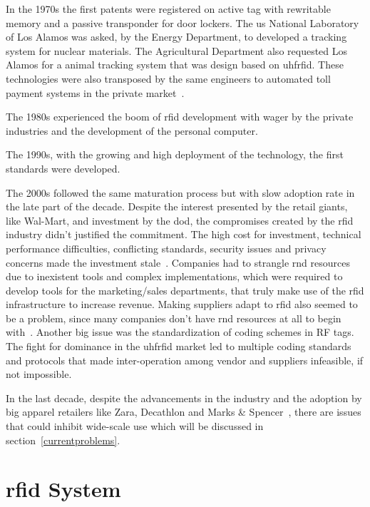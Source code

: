In the 1970s the first patents were registered on active tag with rewritable memory and a passive transponder for door lockers. The \ac{us} National Laboratory of Los Alamos was asked, by the Energy Department, to developed a tracking system for nuclear materials. The Agricultural Department also requested Los Alamos for a animal tracking system that was design based on \ac{uhfrfid}. These technologies were also transposed by the same engineers to automated toll payment systems in the private market~\cite{landtHistoryRFID2005, HistoryRFIDTechnology,casierAnalogCircuitDesign2011}.

The 1980s experienced the boom of \ac{rfid} development with wager by the private industries and the development of the personal computer.

The 1990s, with the growing and high deployment of the technology, the first standards were developed. 

The 2000s followed the same maturation process but with slow adoption rate in the late part of the decade. 
Despite the interest presented by the retail giants, like Wal-Mart, and investment by the \ac{dod}, the compromises created by the \ac{rfid} industry didn't justified the commitment. The high cost for investment, technical performance difficulties, conflicting standards, security issues and privacy concerns made the investment stale~\cite{RFIDAdoptionStalls}. 
Companies had to strangle \ac{rnd} resources due to inexistent tools and complex implementations, which were required to develop tools for the marketing/sales departments, that truly make use of the \ac{rfid} infrastructure to increase revenue.
Making suppliers adapt to \ac{rfid} also seemed to be a problem, since many companies don't have \ac{rnd} resources at all to begin with~\cite{gaudinSuppliersGainFailed2008}.
Another big issue was the standardization of coding schemes in RF tags. The fight for dominance in the \ac{uhfrfid} market led to multiple coding standards and protocols that made inter-operation among vendor and suppliers infeasible, if not impossible.

In the last decade, despite the advancements in the industry and the adoption by big apparel retailers like Zara, Decathlon and Marks \& Spencer~\cite{RFIDRetailApparel}, there are issues that could inhibit wide-scale use which will be discussed in section~\ref{currentproblems}.

\section{\ac{rfid} System}

